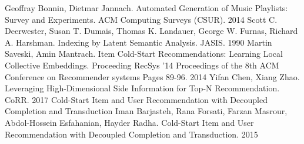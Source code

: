 \documentclass[12pt,twoside]{article}
\begin{document}
\begin{thebibliography}{4}
 Geoffray Bonnin,  	Dietmar Jannach. Automated Generation of Music Playlists: Survey and Experiments. ACM Computing Surveys (CSUR). 2014
Scott C. Deerwester, Susan T. Dumais, Thomas K. Landauer, George W. Furnas, Richard A. Harshman. Indexing by Latent Semantic Analysis. JASIS. 1990
Martin Saveski, Amin Mantrach. Item Cold-Start Recommendations:
Learning Local Collective Embeddings. Proceeding
RecSys '14 Proceedings of the 8th ACM Conference on Recommender systems
Pages 89-96. 2014
Yifan Chen, Xiang Zhao. Leveraging High-Dimensional Side Information for Top-N Recommendation. CoRR. 2017
Cold-Start Item and User Recommendation with Decoupled Completion and Transduction
Iman Barjasteh, Rana Forsati, Farzan Masrour, Abdol-Hossein Esfahanian, Hayder Radha. Cold-Start Item and User Recommendation with Decoupled Completion and Transduction. 2015
\end{thebibliography}
\end{document}
